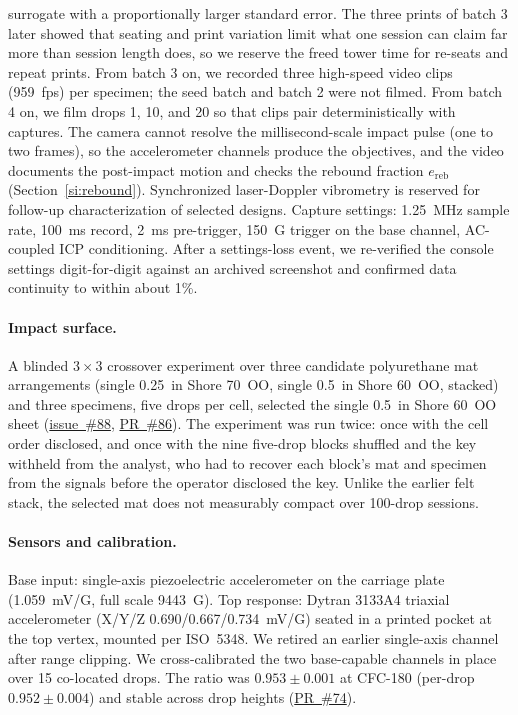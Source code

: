 \documentclass[11pt]{article}
\newcommand{\repo}{https://github.com/vertical-cloud-lab/tensegrity-optimization}
\begin{document}
surrogate with a proportionally larger standard error. The three prints
of batch 3 later showed that seating and print variation limit what one
session can claim far more than session length does, so we reserve the
freed tower time for re-seats and repeat prints. From batch 3 on, we
recorded three high-speed video clips (\SI{959}{fps}) per specimen; the
seed batch and batch 2 were not filmed. From batch 4 on, we film drops
1, 10, and 20 so that clips pair deterministically with captures. The
camera cannot resolve the millisecond-scale impact pulse (one to two
frames), so the accelerometer channels produce the objectives, and the
video documents the post-impact motion and checks the rebound fraction
$e_{\mathrm{reb}}$ (Section~\ref{si:rebound}). Synchronized laser-Doppler vibrometry is
reserved for follow-up characterization of selected designs. Capture
settings:
\SI{1.25}{MHz} sample rate, \SI{100}{ms} record, \SI{2}{ms} pre-trigger,
\SI{150}{G} trigger on the base channel, AC-coupled ICP conditioning.
After a settings-loss event, we re-verified the console settings
digit-for-digit against an archived screenshot and confirmed data
continuity to within about 1\%.

\paragraph{Impact surface.} A blinded $3\times3$ crossover experiment over
three candidate polyurethane mat arrangements (single \SI{0.25}{in} Shore
70~OO, single \SI{0.5}{in} Shore 60~OO, stacked) and three specimens, five
drops per cell, selected the single \SI{0.5}{in} Shore 60~OO sheet
(\href{\repo/issues/88}{issue~\#88}, \href{\repo/pull/86}{PR~\#86}). The
experiment was run twice: once with the cell order disclosed, and once
with the nine five-drop blocks shuffled and the key withheld from the
analyst, who had to recover each block's mat and specimen from the
signals before the operator disclosed the key. Unlike the earlier felt
stack, the selected mat does not measurably compact over 100-drop
sessions.

\paragraph{Sensors and calibration.} Base input: single-axis piezoelectric
accelerometer on the carriage plate (\SI{1.059}{mV/G}, full scale
\SI{9443}{G}). Top response: Dytran 3133A4 triaxial accelerometer
(X/Y/Z 0.690/0.667/\SI{0.734}{mV/G}) seated in a printed pocket at the top
vertex, mounted per ISO~5348. We retired an earlier single-axis channel
after range clipping. We cross-calibrated the two base-capable channels in
place over 15 co-located drops. The ratio was $0.953 \pm 0.001$ at
CFC-180 (per-drop $0.952 \pm 0.004$) and stable across drop heights
(\href{\repo/pull/74}{PR~\#74}).
\end{document}
